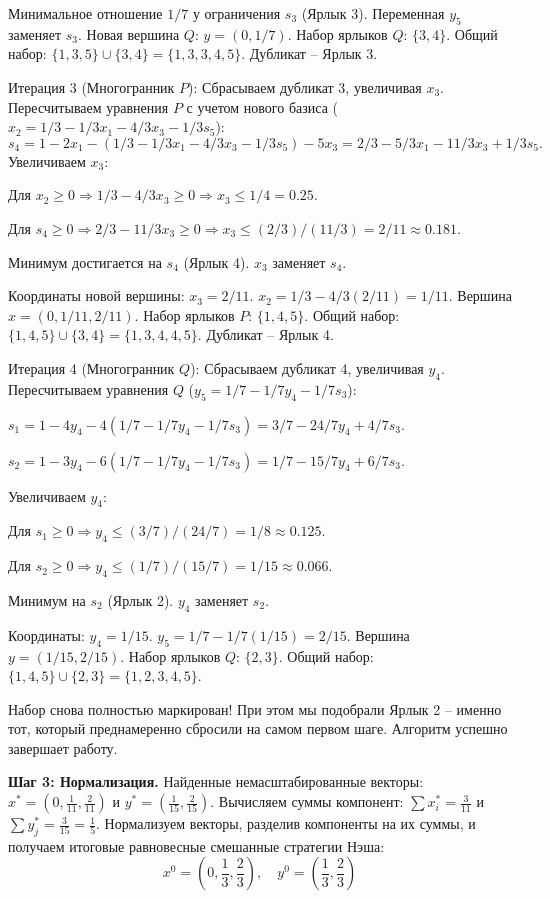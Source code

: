 Минимальное отношение $1/7$ у ограничения $s_3$ (Ярлык 3). Переменная $y_5$ заменяет $s_3$.
Новая вершина $Q$: $y = (0, 1/7)$. Набор ярлыков $Q$: $\{3, 4\}$.
Общий набор: $\{1, 3, 5\} \cup \{3, 4\} = \{1, 3, 3, 4, 5\}$. Дубликат – Ярлык 3.

Итерация 3 (Многогранник $P$): Сбрасываем дубликат 3, увеличивая $x_3$. 
Пересчитываем уравнения $P$ с учетом нового базиса ($x_2 = 1/3 - 1/3x_1 - 4/3x_3 - 1/3s_5$):
\begin{equation}
s_4 = 1 - 2x_1 - (1/3 - 1/3x_1 - 4/3x_3 - 1/3s_5) - 5x_3 = 2/3 - 5/3x_1 - 11/3x_3 + 1/3s_5.
\end{equation}
Увеличиваем $x_3$:

Для $x_2 \ge 0 \Rightarrow 1/3 - 4/3x_3 \ge 0 \Rightarrow x_3 \le 1/4 = 0.25$.

Для $s_4 \ge 0 \Rightarrow 2/3 - 11/3x_3 \ge 0 \Rightarrow x_3 \le (2/3)/(11/3) = 2/11 \approx 0.181$.

Минимум достигается на $s_4$ (Ярлык 4). $x_3$ заменяет $s_4$.

Координаты новой вершины: $x_3 = 2/11$. $x_2 = 1/3 - 4/3(2/11) = 1/11$. Вершина $x = (0, 1/11, 2/11)$.
Набор ярлыков $P$: $\{1, 4, 5\}$. Общий набор: $\{1, 4, 5\} \cup \{3, 4\} = \{1, 3, 4, 4, 5\}$. Дубликат – Ярлык 4.

Итерация 4 (Многогранник $Q$): Сбрасываем дубликат 4, увеличивая $y_4$.
Пересчитываем уравнения $Q$ ($y_5 = 1/7 - 1/7y_4 - 1/7s_3$):

$s_1 = 1 - 4y_4 - 4(1/7 - 1/7y_4 - 1/7s_3) = 3/7 - 24/7y_4 + 4/7s_3$.

$s_2 = 1 - 3y_4 - 6(1/7 - 1/7y_4 - 1/7s_3) = 1/7 - 15/7y_4 + 6/7s_3$.

Увеличиваем $y_4$:

Для $s_1 \ge 0 \Rightarrow y_4 \le (3/7)/(24/7) = 1/8 \approx 0.125$.

Для $s_2 \ge 0 \Rightarrow y_4 \le (1/7)/(15/7) = 1/15 \approx 0.066$.

Минимум на $s_2$ (Ярлык 2). $y_4$ заменяет $s_2$.

Координаты: $y_4 = 1/15$. $y_5 = 1/7 - 1/7(1/15) = 2/15$. Вершина $y = (1/15, 2/15)$.
Набор ярлыков $Q$: $\{2, 3\}$. Общий набор: $\{1, 4, 5\} \cup \{2, 3\} = \{1, 2, 3, 4, 5\}$.

Набор снова полностью маркирован! При этом мы подобрали Ярлык 2 – именно тот, который преднамеренно сбросили на самом первом шаге. Алгоритм успешно завершает работу.

\textbf{Шаг 3: Нормализация.}
Найденные немасштабированные векторы: $x^* = (0, \frac{1}{11}, \frac{2}{11})$ и $y^* = (\frac{1}{15}, \frac{2}{15})$.
Вычисляем суммы компонент: $\sum x^*_i = \frac{3}{11}$ и $\sum y^*_j = \frac{3}{15} = \frac{1}{5}$.
Нормализуем векторы, разделив компоненты на их суммы, и получаем итоговые равновесные смешанные стратегии Нэша:
\begin{equation}
x^0 = \left(0, \frac{1}{3}, \frac{2}{3}\right), \quad y^0 = \left(\frac{1}{3}, \frac{2}{3}\right)
\end{equation}


